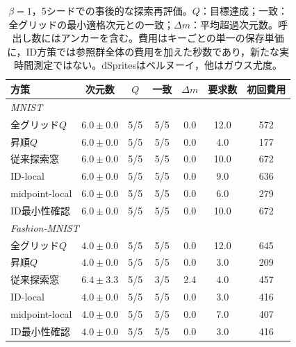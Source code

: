\documentclass[11pt,a4paper]{ltjsarticle}
\begin{document}
\begin{table}[H]
\caption{$\beta=1$，5シードでの事後的な探索再評価。$Q$：目標達成；一致：全グリッドの最小適格次元との一致；$\Delta m$：平均超過次元数。呼出し数にはアンカーを含む。費用はキーごとの単一の保存単価に，ID方策では参照群全体の費用を加えた秒数であり，新たな実時間測定ではない。dSpritesはベルヌーイ，他はガウス尤度。}\label{tab:replay1}
\small
\setlength{\tabcolsep}{3pt}
\begin{tabular*}{\textwidth}{@{\extracolsep{\fill}}lcccccc@{}}
\toprule
方策 & 次元数 & $Q$ & 一致 & $\Delta m$ & 要求数 & 初回費用 \\
\midrule
\multicolumn{7}{l}{\emph{MNIST}} \\
全グリッド$Q$ & $6.0 \pm 0.0$ & 5/5 & 5/5 & 0.0 & 12.0 & 572 \\
昇順$Q$ & $6.0 \pm 0.0$ & 5/5 & 5/5 & 0.0 & 4.0 & 177 \\
従来探索窓 & $6.0 \pm 0.0$ & 5/5 & 5/5 & 0.0 & 10.0 & 672 \\
ID-local & $6.0 \pm 0.0$ & 5/5 & 5/5 & 0.0 & 9.0 & 636 \\
midpoint-local & $6.0 \pm 0.0$ & 5/5 & 5/5 & 0.0 & 6.0 & 279 \\
ID最小性確認 & $6.0 \pm 0.0$ & 5/5 & 5/5 & 0.0 & 10.0 & 672 \\
\midrule
\multicolumn{7}{l}{\emph{Fashion-MNIST}} \\
全グリッド$Q$ & $4.0 \pm 0.0$ & 5/5 & 5/5 & 0.0 & 12.0 & 645 \\
昇順$Q$ & $4.0 \pm 0.0$ & 5/5 & 5/5 & 0.0 & 3.0 & 209 \\
従来探索窓 & $6.4 \pm 3.3$ & 5/5 & 3/5 & 2.4 & 4.0 & 457 \\
ID-local & $4.0 \pm 0.0$ & 5/5 & 5/5 & 0.0 & 3.0 & 416 \\
midpoint-local & $4.0 \pm 0.0$ & 5/5 & 5/5 & 0.0 & 7.0 & 407 \\
ID最小性確認 & $4.0 \pm 0.0$ & 5/5 & 5/5 & 0.0 & 3.0 & 416 \\
\bottomrule\end{tabular*}
\end{table}
\end{document}

